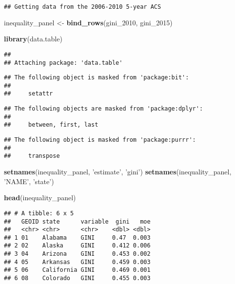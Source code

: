 \documentclass[
]{article}
\newenvironment{Shaded}{\begin{snugshade}}{\end{snugshade}}
\newcommand{\DecValTok}[1]{\textcolor[rgb]{0.00,0.00,0.81}{#1}}
\newcommand{\KeywordTok}[1]{\textcolor[rgb]{0.13,0.29,0.53}{\textbf{#1}}}
\newcommand{\NormalTok}[1]{#1}
\newcommand{\StringTok}[1]{\textcolor[rgb]{0.31,0.60,0.02}{#1}}
\begin{document}
\begin{verbatim}
## Getting data from the 2006-2010 5-year ACS
\end{verbatim}

\begin{Shaded}
\begin{Highlighting}[]
\NormalTok{inequality_panel <-}\StringTok{ }\KeywordTok{bind_rows}\NormalTok{(gini_}\DecValTok{2010}\NormalTok{, gini_}\DecValTok{2015}\NormalTok{)}

\KeywordTok{library}\NormalTok{(data.table)}
\end{Highlighting}
\end{Shaded}

\begin{verbatim}
## 
## Attaching package: 'data.table'
\end{verbatim}

\begin{verbatim}
## The following object is masked from 'package:bit':
## 
##     setattr
\end{verbatim}

\begin{verbatim}
## The following objects are masked from 'package:dplyr':
## 
##     between, first, last
\end{verbatim}

\begin{verbatim}
## The following object is masked from 'package:purrr':
## 
##     transpose
\end{verbatim}

\begin{Shaded}
\begin{Highlighting}[]
\KeywordTok{setnames}\NormalTok{(inequality_panel, }\StringTok{'estimate'}\NormalTok{, }\StringTok{'gini'}\NormalTok{)}
\KeywordTok{setnames}\NormalTok{(inequality_panel, }\StringTok{'NAME'}\NormalTok{, }\StringTok{'state'}\NormalTok{)}

\KeywordTok{head}\NormalTok{(inequality_panel)}
\end{Highlighting}
\end{Shaded}

\begin{verbatim}
## # A tibble: 6 x 5
##   GEOID state      variable  gini   moe
##   <chr> <chr>      <chr>    <dbl> <dbl>
## 1 01    Alabama    GINI     0.47  0.003
## 2 02    Alaska     GINI     0.412 0.006
## 3 04    Arizona    GINI     0.453 0.002
## 4 05    Arkansas   GINI     0.459 0.003
## 5 06    California GINI     0.469 0.001
## 6 08    Colorado   GINI     0.455 0.003
\end{verbatim}
\end{document}
